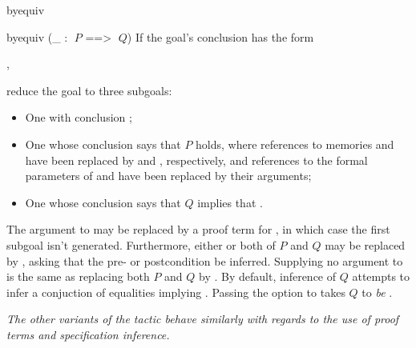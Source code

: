 \begin{tactic}{byequiv}
  \begin{tsyntax}{byequiv (_ : $\;P$ ==> $\;Q$)}
    If the goal's conclusion has the form
    \begin{center}
      ,
    \end{center}
    reduce the goal to three subgoals:
    \begin{itemize}
    \item One with conclusion
          ;

    \item One whose conclusion says that $P$ holds, where
      references to memories  and  have been replaced
      by  and , respectively, and references
      to the formal parameters of  and
       have been replaced by their arguments;

    \item One whose conclusion says that $Q$ implies that
      .
    \end{itemize}

    The argument to  may be replaced by a proof term for
    , in which
    case the first subgoal isn't generated.
    Furthermore, either or both of $P$ and $Q$ may be replaced by
    \ec{_}, asking that the pre- or postcondition be inferred.
    Supplying no argument to  is the same as replacing
    both $P$ and $Q$ by \ec{_}. By default, inference of $Q$ attempts
    to infer a conjuction of equalities implying   
    . Passing the \ec{[-eq]} option to
     takes $Q$ to \emph{be} .

    \medskip
    \emph{The other variants of the tactic behave similarly with
    regards to the use of proof terms and specification inference.}


\end{tsyntax}
\end{tactic}
